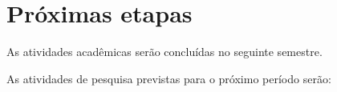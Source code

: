 \documentclass[a4paper, 11pt]{article}
\begin{document}
\begin{comment}
\subsection{Dificultades encontradas}

\begin{itemize}
\item Uma das dificultades encontradas foi que o servi\c{c}o SkyBoT teve algumas atualiza\c{c}\~oes recentes, e o Astropy teve alguns problemas para ler os arquivos de saida gerados pelo SkyBoT. O problema estava na defini\c{c}\~ao de um dos par\^ametros adicionados e ent\~ao foi reportado para o respons\'avel, o Dr. Jerome Berthier, e ele prontamente consertou o problema.
\item Considerando que o SkyBoT \'e um servi\c{c}o online, toma um certo tempo acessar ao servi\c{c}o e esse tempo \'e consider\'avel levando em conta a quantidade de dados. Para resolver esta dificuldade está sendo instalado o SkyBoT nas instala\c{c}\~oes do LIneA e assim poder usar o servi\c{c}o de forma local e reduzir o tempo de busca.
\item As imagens do levantamento DES s\'o s\~ao disponibilizados um ano depois da data da observa\c{c}\~ao, o que significaria que n\~ao poderiamos ter acesso \`as imagens mais recentes. O trabalho do meu mestrado ajudou ao projeto ``\textit{Identifying known Solar System objects in DES images and predicting stellar occultations by them}'', liderado pelo Dr. Julio camargo e eu tamb\'em sou membro oficial, que foi aprovado recentemente pelo comit\^e de gerenciamento do DES para explorar seus dados observacionais com um fim espec\'ifico: localizar TNOs conhecidos nas imagens oriundas de seu levantamento, determinar posi\c{c}\~oes precisas desses objetos, refinar suas \'orbitas com aux\'ilio dessas posi\c{c}\~oes, e determinar os respectivos mapas de oculta\c{c}\~ao (figuras indicando quando e onde, sobre a Terra, tais eventos poderão ser observados). Ent\~ao como membro desta colabora\c{c}\~ao externa do DES ser\'a poss\'ivel ter acesso \`as imagens recentes.
\end{itemize}

\end{comment}
\section{Pr\'oximas etapas}

As atividades acad\^emicas ser\~ao conclu\'idas no seguinte semestre.

\noindent As atividades de pesquisa previstas para o pr\'oximo per\'iodo ser\~ao:
\end{document}
